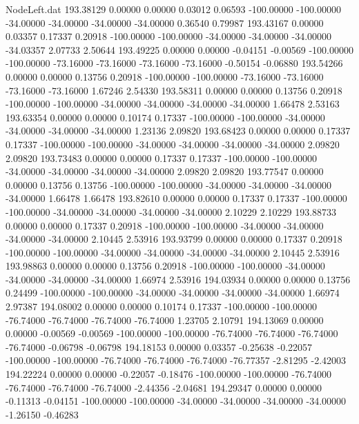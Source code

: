 \begin{filecontents}{NodeLeft.dat}
 193.38129    0.00000    0.00000     0.03012    0.06593 -100.00000 -100.00000  -34.00000  -34.00000  -34.00000  -34.00000    0.36540    0.79987
 193.43167    0.00000    0.03357     0.17337    0.20918 -100.00000 -100.00000  -34.00000  -34.00000  -34.00000  -34.03357    2.07733    2.50644
 193.49225    0.00000    0.00000    -0.04151   -0.00569 -100.00000 -100.00000  -73.16000  -73.16000  -73.16000  -73.16000   -0.50154   -0.06880
 193.54266    0.00000    0.00000     0.13756    0.20918 -100.00000 -100.00000  -73.16000  -73.16000  -73.16000  -73.16000    1.67246    2.54330
 193.58311    0.00000    0.00000     0.13756    0.20918 -100.00000 -100.00000  -34.00000  -34.00000  -34.00000  -34.00000    1.66478    2.53163
 193.63354    0.00000    0.00000     0.10174    0.17337 -100.00000 -100.00000  -34.00000  -34.00000  -34.00000  -34.00000    1.23136    2.09820
 193.68423    0.00000    0.00000     0.17337    0.17337 -100.00000 -100.00000  -34.00000  -34.00000  -34.00000  -34.00000    2.09820    2.09820
 193.73483    0.00000    0.00000     0.17337    0.17337 -100.00000 -100.00000  -34.00000  -34.00000  -34.00000  -34.00000    2.09820    2.09820
 193.77547    0.00000    0.00000     0.13756    0.13756 -100.00000 -100.00000  -34.00000  -34.00000  -34.00000  -34.00000    1.66478    1.66478
 193.82610    0.00000    0.00000     0.17337    0.17337 -100.00000 -100.00000  -34.00000  -34.00000  -34.00000  -34.00000    2.10229    2.10229
 193.88733    0.00000    0.00000     0.17337    0.20918 -100.00000 -100.00000  -34.00000  -34.00000  -34.00000  -34.00000    2.10445    2.53916
 193.93799    0.00000    0.00000     0.17337    0.20918 -100.00000 -100.00000  -34.00000  -34.00000  -34.00000  -34.00000    2.10445    2.53916
 193.98863    0.00000    0.00000     0.13756    0.20918 -100.00000 -100.00000  -34.00000  -34.00000  -34.00000  -34.00000    1.66974    2.53916
 194.03934    0.00000    0.00000     0.13756    0.24499 -100.00000 -100.00000  -34.00000  -34.00000  -34.00000  -34.00000    1.66974    2.97387
 194.08002    0.00000    0.00000     0.10174    0.17337 -100.00000 -100.00000  -76.74000  -76.74000  -76.74000  -76.74000    1.23705    2.10791
 194.13069    0.00000    0.00000    -0.00569   -0.00569 -100.00000 -100.00000  -76.74000  -76.74000  -76.74000  -76.74000   -0.06798   -0.06798
 194.18153    0.00000    0.03357    -0.25638   -0.22057 -100.00000 -100.00000  -76.74000  -76.74000  -76.74000  -76.77357   -2.81295   -2.42003
 194.22224    0.00000    0.00000    -0.22057   -0.18476 -100.00000 -100.00000  -76.74000  -76.74000  -76.74000  -76.74000   -2.44356   -2.04681
 194.29347    0.00000    0.00000    -0.11313   -0.04151 -100.00000 -100.00000  -34.00000  -34.00000  -34.00000  -34.00000   -1.26150   -0.46283

\end{filecontents}

